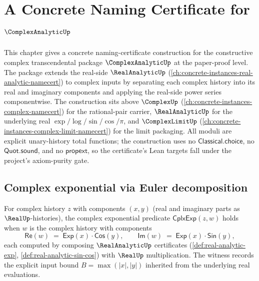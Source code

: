 \chapter{A Concrete Naming Certificate for \(\ComplexAnalyticUp\)}
\label{ch:concrete-instances-complex-analytic-namecert}

This chapter gives a concrete naming-certificate construction for the constructive complex transcendental package \(\ComplexAnalyticUp\) at the paper-proof level. The package extends the real-side \(\RealAnalyticUp\) (\autoref{ch:concrete-instances-real-analytic-namecert}) to complex inputs by separating each complex history into its real and imaginary components and applying the real-side power series componentwise. The construction sits above \(\ComplexUp\) (\autoref{ch:concrete-instances-complex-namecert}) for the rational-pair carrier, \(\RealAnalyticUp\) for the underlying real \(\exp / \log / \sin / \cos / \pi\), and \(\ComplexLimitUp\) (\autoref{ch:concrete-instances-complex-limit-namecert}) for the limit packaging. All moduli are explicit unary-history total functions; the construction uses no \(\mathsf{Classical.choice}\), no \(\mathsf{Quot.sound}\), and no \(\mathsf{propext}\), so the certificate's Lean targets fall under the project's axiom-purity gate.

\section{Complex exponential via Euler decomposition}
\label{sec:cplx-analytic-exp}

\begin{definition}
\label{def:cplx-exp}
For complex history \(z\) with components \((x, y)\) (real and imaginary parts as \(\RealUp\)-histories), the complex exponential predicate \(\mathsf{CplxExp}(z, w)\) holds when \(w\) is the complex history with components
$$
\mathsf{Re}(w) \;=\; \mathsf{Exp}(x) \cdot \mathsf{Cos}(y),
\qquad
\mathsf{Im}(w) \;=\; \mathsf{Exp}(x) \cdot \mathsf{Sin}(y),
$$
each computed by composing \(\RealAnalyticUp\) certificates (\autoref{def:real-analytic-exp}, \autoref{def:real-analytic-sin-cos}) with \(\RealUp\) multiplication. The witness records the explicit input bound \(B = \max(|x|, |y|)\) inherited from the underlying real evaluations.
\end{definition}

